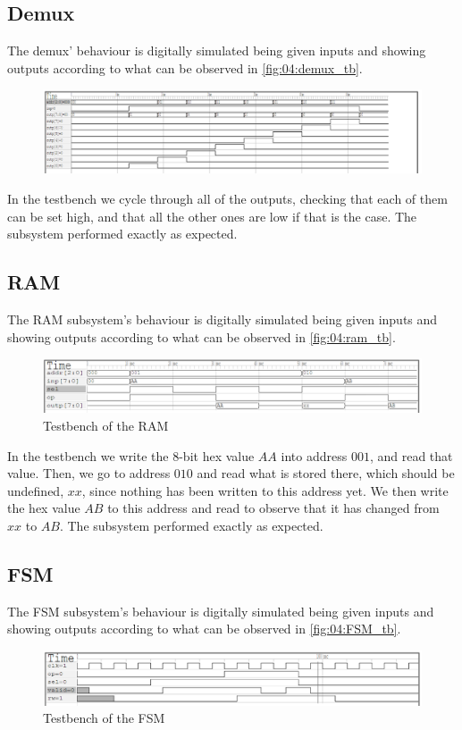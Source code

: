 \subsection{Demux}
The demux' behaviour is digitally simulated being given inputs and showing outputs according to what can be observed in \autoref{fig:04:demux_tb}.

\begin{figure}[H]
    \centering
    \includegraphics[width=0.8\linewidth]{LaTeX_2/Figures/demux1to8_tb.png}
    \caption{}
    \label{fig:04:demux_tb}
\end{figure}
In the testbench we cycle through all of the outputs, checking that each of them can be set high, and that all the other ones are low if that is the case. The subsystem performed exactly as expected.

\subsection{RAM}
The RAM subsystem's behaviour is digitally simulated being given inputs and showing outputs according to what can be observed in \autoref{fig:04:ram_tb}.
\begin{figure}[H]
    \centering
    \includegraphics[width=0.9\linewidth]{LaTeX_2/Figures/ram_tb.png}
    \caption{Testbench of the RAM}
    \label{fig:04:ram_tb}
\end{figure}
In the testbench we write the 8-bit hex value $AA$ into address $001$, and read that value. Then, we go to address $010$ and read what is stored there, which should be undefined, $xx$, since nothing has been written to this address yet. We then write the hex value $AB$ to this address and read to observe that it has changed from $xx$ to $AB$. The subsystem performed exactly as expected.

\subsection{FSM}
The FSM subsystem's behaviour is digitally simulated being given inputs and showing outputs according to what can be observed in \autoref{fig:04:FSM_tb}.
\begin{figure}[H]
    \centering
    \includegraphics[width=0.9\linewidth]{LaTeX_2/Figures/FSM_tb.png}
    \caption{Testbench of the FSM}
    \label{fig:04:FSM_tb}
\end{figure}

